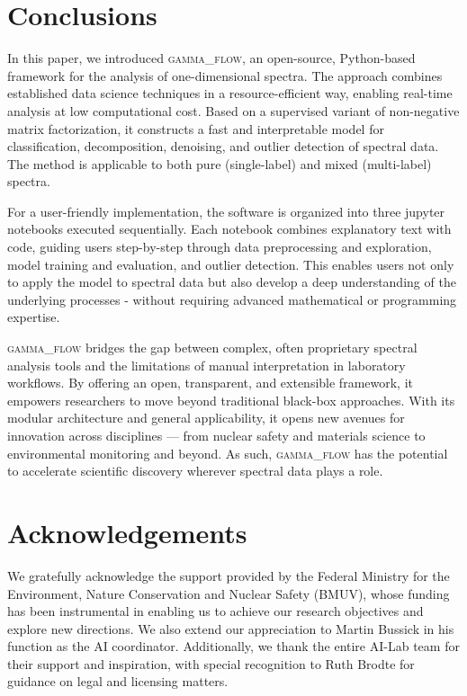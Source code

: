 \documentclass[preprint, 12pt, a4paper]{elsarticle}
\begin{document}
\section{Conclusions}
In this paper, we introduced \textsc{gamma\_flow}, an open-source, Python-based framework for the analysis of one-dimensional spectra. The approach combines established data science techniques in a resource-efficient way, enabling real-time analysis at low computational cost. Based on a supervised variant of non-negative matrix factorization, it constructs a fast and interpretable model for classification, decomposition, denoising, and outlier detection of spectral data. The method is applicable to both pure (single-label) and mixed (multi-label) spectra. 

For a user-friendly implementation, the software is organized into three jupyter notebooks executed sequentially. Each notebook combines explanatory text with code, guiding users step-by-step through data preprocessing and exploration, model training and evaluation, and outlier detection. This enables users not only to apply the model to spectral data but also develop a deep understanding of the underlying processes - without requiring advanced mathematical or programming expertise.  

\textsc{gamma\_flow} bridges the gap between complex, often proprietary spectral analysis tools and the limitations of manual interpretation in laboratory workflows. By offering an open, transparent, and extensible framework, it empowers researchers to move beyond traditional black-box approaches. With its modular architecture and general applicability, it opens new avenues for innovation across disciplines — from nuclear safety and materials science to environmental monitoring and beyond. As such, \textsc{gamma\_flow} has the potential to accelerate scientific discovery wherever spectral data plays a role.

\section*{Acknowledgements}
We gratefully acknowledge the support provided by the Federal Ministry for the Environment, Nature Conservation and Nuclear Safety (BMUV), whose funding has been instrumental in enabling us to achieve our research objectives and explore new directions. 
We also extend our appreciation to Martin Bussick in his function as the AI coordinator. 
Additionally, we thank the entire AI-Lab team for their support and inspiration, with special recognition to Ruth Brodte for guidance on legal and licensing matters.

 

\end{document}
